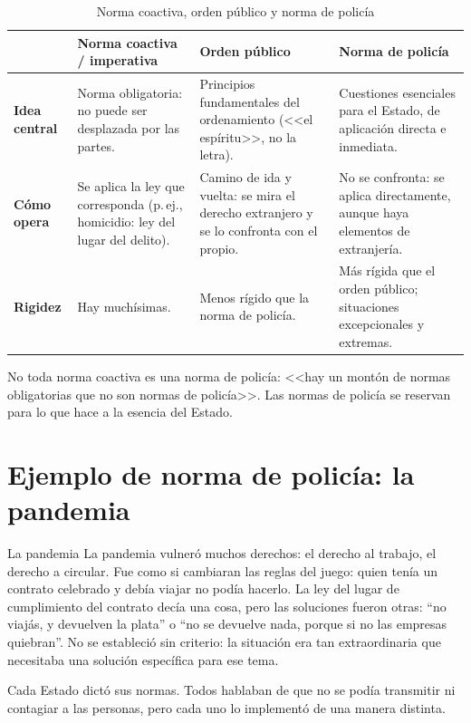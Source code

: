 \documentclass[12pt,oneside]{book}
\begin{document}
\begin{table}[H]
\centering
\caption{Norma coactiva, orden p\'ublico y norma de polic\'ia}
\small
\begin{tabularx}{\textwidth}{
    >{\raggedright\arraybackslash}p{}
    >{\raggedright\arraybackslash}X
    >{\raggedright\arraybackslash}X
    >{\raggedright\arraybackslash}X
}
\toprule
 & \textbf{Norma coactiva / imperativa} & \textbf{Orden p\'ublico} & \textbf{Norma de polic\'ia} \\
\midrule
\textbf{Idea central} &
Norma obligatoria: no puede ser desplazada por las partes. &
Principios fundamentales del ordenamiento (<<el esp\'iritu>>, no la letra). &
Cuestiones esenciales para el Estado, de aplicaci\'on directa e inmediata. \\
\addlinespace
\textbf{C\'omo opera} &
Se aplica la ley que corresponda (p.\,ej., homicidio: ley del lugar del delito). &
Camino de ida y vuelta: se mira el derecho extranjero y se lo confronta con el propio. &
No se confronta: se aplica directamente, aunque haya elementos de extranjer\'ia. \\
\addlinespace
\textbf{Rigidez} &
Hay much\'isimas. &
Menos r\'igido que la norma de polic\'ia. &
M\'as r\'igida que el orden p\'ublico; situaciones excepcionales y extremas. \\
\bottomrule
\end{tabularx}
\end{table}

\begin{important}
No toda norma coactiva es una norma de polic\'ia: <<hay un mont\'on de normas obligatorias que no son normas de polic\'ia>>. Las normas de polic\'ia se reservan para lo que hace a la esencia del Estado.
\end{important}

\section{Ejemplo de norma de polic\'ia: la pandemia}


\begin{example}{La pandemia}
La pandemia vulner\'o muchos derechos: el derecho al trabajo, el derecho a circular. Fue como si cambiaran las reglas del juego: quien ten\'ia un contrato celebrado y deb\'ia viajar no pod\'ia hacerlo. La ley del lugar de cumplimiento del contrato dec\'ia una cosa, pero las soluciones fueron otras: ``no viaj\'as, y devuelven la plata'' o ``no se devuelve nada, porque si no las empresas quiebran''. No se estableci\'o sin criterio: la situaci\'on era tan extraordinaria que necesitaba una soluci\'on espec\'ifica para ese tema.

Cada Estado dict\'o sus normas. Todos hablaban de que no se pod\'ia transmitir ni contagiar a las personas, pero cada uno lo implement\'o de una manera distinta.
\end{example}
\end{document}
